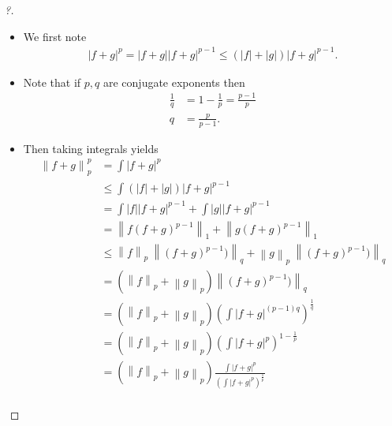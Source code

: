 \begin{proof}[?]

\envlist

\begin{itemize}
\item
  We first note
  \begin{align*}  
  {\left\lvert {f+g} \right\rvert}^p = {\left\lvert {f+g} \right\rvert}{\left\lvert {f+g} \right\rvert}^{p-1} \leq \left( {\left\lvert {f} \right\rvert} + {\left\lvert {g} \right\rvert}\right) {\left\lvert {f+g} \right\rvert}^{p-1}
  .\end{align*}
\item
  Note that if \(p,q\) are conjugate exponents then
  \begin{align*}  
  \frac 1 q &= 1 - \frac 1 p = \frac{p-1} p \\
  q &= \frac p {p-1} 
  .\end{align*}
\item
  Then taking integrals yields
  \begin{align*}  
  {\left\lVert {f+g} \right\rVert}_p^p &=
  \int {\left\lvert {f+g} \right\rvert}^p \\
  &\leq \int \left( {\left\lvert {f} \right\rvert} + {\left\lvert {g} \right\rvert}\right) {\left\lvert {f+g} \right\rvert}^{p-1} \\ 
  &= \int {\left\lvert {f} \right\rvert} {\left\lvert {f+g} \right\rvert}^{p-1} + \int {\left\lvert {g} \right\rvert} {\left\lvert {f+g} \right\rvert}^{p-1} \\
  &= {\left\lVert {f(f+g)^{p-1}} \right\rVert}_1 + {\left\lVert {g(f+g)^{p-1}} \right\rVert}_1 \\
  &\leq {\left\lVert {f} \right\rVert}_p ~{\left\lVert {(f+g)^{p-1})} \right\rVert}_q + {\left\lVert {g} \right\rVert}_p ~{\left\lVert {(f+g)^{p-1})} \right\rVert}_q \\
  &= \left( {\left\lVert {f} \right\rVert}_p + {\left\lVert {g} \right\rVert}_p \right) {\left\lVert { (f+g)^{p-1})} \right\rVert}_q \\
  &= \left( {\left\lVert {f} \right\rVert}_p + {\left\lVert {g} \right\rVert}_p \right) \left( \int {\left\lvert {f+g} \right\rvert}^{(p-1)q} \right)^{\frac 1 q} \\
  &= \left( {\left\lVert {f} \right\rVert}_p + {\left\lVert {g} \right\rVert}_p \right) \left( \int {\left\lvert {f+g} \right\rvert}^{p} \right)^{1 - \frac 1 p} \\
  &= \left( {\left\lVert {f} \right\rVert}_p + {\left\lVert {g} \right\rVert}_p \right) \frac{\int {\left\lvert {f+g} \right\rvert}^{p} }{\left( \int {\left\lvert {f+g} \right\rvert}^{p} \right)^{\frac 1 p}} \\

\end{align*}
\end{itemize}
\end{proof}

